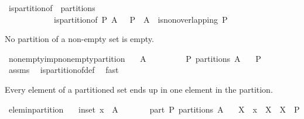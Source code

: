 \begin{isabellebody}
\isamarkuptrue%
\isamarkupfalse%
\ is{\isacharunderscore}partition{\isacharunderscore}of\ {\isacharparenleft}\ {\isachardoublequoteopen}partitions{\isachardoublequoteclose}\ {}{}{\isacharparenright}\isanewline
\ \ \ \ \ \ \ \ \ \ \ \ {\isachardoublequoteopen}is{\isacharunderscore}partition{\isacharunderscore}of\ P\ A\ {\isacharequal}\ {\isacharparenleft}{\isasymUnion}\ P\ {\isacharequal}\ A\ {\isasymand}\ is{\isacharunderscore}non{\isacharunderscore}overlapping\ P{\isacharparenright}{\isachardoublequoteclose}%
\begin{isamarkuptext}%
No partition of a non-empty set is empty.%
\end{isamarkuptext}%
\isamarkuptrue%
\isamarkupfalse%
\ non{\isacharunderscore}empty{\isacharunderscore}imp{\isacharunderscore}non{\isacharunderscore}empty{\isacharunderscore}partition{\isacharcolon}\isanewline
\ \ \ {\isachardoublequoteopen}A\ {\isasymnoteq}\ {\isacharbraceleft}{\isacharbraceright}{\isachardoublequoteclose}\isanewline
\ \ \ \ \ \ \ {\isachardoublequoteopen}P\ partitions\ A{\isachardoublequoteclose}\isanewline
\ \ \ {\isachardoublequoteopen}P\ {\isasymnoteq}\ {\isacharbraceleft}{\isacharbraceright}{\isachardoublequoteclose}\isanewline
%
\isadelimproof
\ \ %
\endisadelimproof
%
\isatagproof
{}\isamarkupfalse%
\ assms\ \isamarkupfalse%
\ is{\isacharunderscore}partition{\isacharunderscore}of{\isacharunderscore}def\ \isamarkupfalse%
\ fast%
\endisatagproof
{\isafoldproof}%
%
\isadelimproof
%
\endisadelimproof
%
\begin{isamarkuptext}%
Every element of a partitioned set ends up in one element in the partition.%
\end{isamarkuptext}%
\isamarkuptrue%
\isamarkupfalse%
\ elem{\isacharunderscore}in{\isacharunderscore}partition{\isacharcolon}\isanewline
\ \ \ in{\isacharunderscore}set{\isacharcolon}\ {\isachardoublequoteopen}x\ {\isasymin}\ A{\isachardoublequoteclose}\isanewline
\ \ \ \ \ \ \ part{\isacharcolon}\ {\isachardoublequoteopen}P\ partitions\ A{\isachardoublequoteclose}\isanewline
\ \ \ X\ \ {\isachardoublequoteopen}x\ {\isasymin}\ X{\isachardoublequoteclose}\ \ {\isachardoublequoteopen}X\ {\isasymin}\ P{\isachardoublequoteclose}\isanewline
%
\isadelimproof
\ \ %
\endisadelimproof
%
\isatagproof
{}\isamarkupfalse%

\end{isabellebody}
